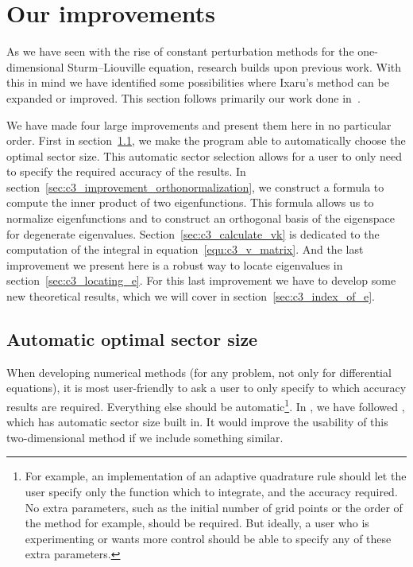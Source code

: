 \section{Our improvements}\label{sec:c3_improvements}

As we have seen with the rise of constant perturbation methods for the one-dimensional Sturm--Liouville equation, research builds upon previous work. With this in mind we have identified some possibilities where Ixaru's method can be expanded or improved. This section follows primarily our work done in~\cite{baeyens_fast_2020}.

We have made four large improvements and present them here in no particular order. First in section~\ref{sec:c3_improvement_automatic_sectors}, we make the program able to automatically choose the optimal sector size. This automatic sector selection allows for a user to only need to specify the required accuracy of the results. In section~\ref{sec:c3_improvement_orthonormalization}, we construct a formula to compute the inner product of two eigenfunctions. This formula allows us to normalize eigenfunctions and to construct an orthogonal basis of the eigenspace for degenerate eigenvalues. Section~\ref{sec:c3_calculate_vk} is dedicated to the computation of the integral in equation~\eqref{equ:c3_v_matrix}. And the last improvement we present here is a robust way to locate eigenvalues in section~\ref{sec:c3_locating_e}. For this last improvement we have to develop some new theoretical results, which we will cover in section~\ref{sec:c3_index_of_e}.


\subsection{Automatic optimal sector size}\label{sec:c3_improvement_automatic_sectors}

When developing numerical methods (for any problem, not only for differential equations), it is most user-friendly to ask a user to only specify to which accuracy results are required. Everything else should be automatic\footnote{For example, an implementation of an adaptive quadrature rule should let the user specify only the function which to integrate, and the accuracy required. No extra parameters, such as the initial number of grid points or the order of the method for example, should be required. But ideally, a user who is experimenting or wants more control should be able to specify any of these extra parameters.}. In , we have followed , which has automatic sector size built in. It would improve the usability of this two-dimensional method if we include something similar.

